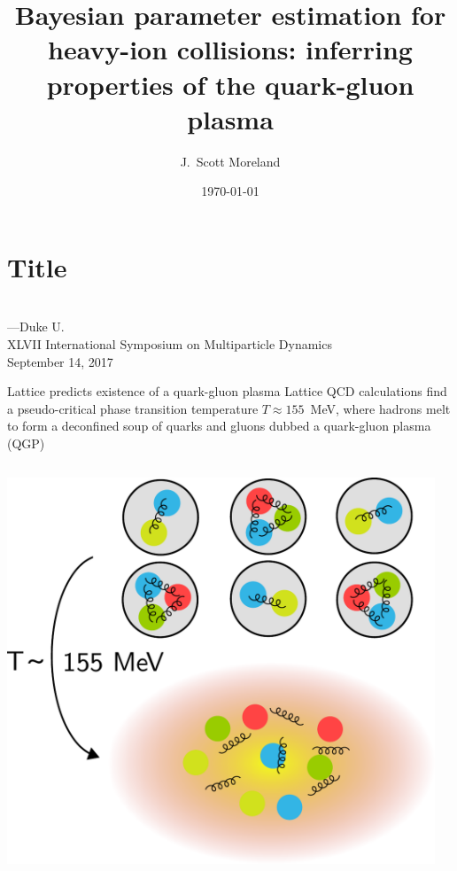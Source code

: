 \documentclass{beamer}
\title[Bayesian parameter estimation for HIC]{Bayesian parameter estimation for heavy-ion collisions: inferring properties of the quark-gluon plasma}
\author[J.\ S.\ Moreland]{J.\ Scott Moreland}
\institute[Duke U.]{Duke Univerity}
\date{\today}
\begin{document}
\section{Title}


\begin{frame}
  \centering \vspace{.3\textheight}
  {\color{theme}\large\rm\inserttitle} \\[.04\textheight]
  {\small \insertauthor---Duke U.} \\[1ex]
  {\small XLVII International Symposium on Multiparticle Dynamics\\September 14, 2017}
\end{frame}


\begin{frame}{Lattice predicts existence of a quark-gluon plasma}
  Lattice QCD calculations find a pseudo-critical phase transition temperature $T \approx 155$~MeV, where hadrons melt to form a deconfined soup of quarks and gluons dubbed a quark-gluon plasma (QGP)\\[2ex]
  \begin{columns}
    \begin{column}{0.47\textwidth}
        \includegraphics[width=\columnwidth]{confined_deconfined}
    \end{column}
    \begin{column}{0.4\textwidth}

\end{column}
\end{columns}
\end{frame}
\end{document}
